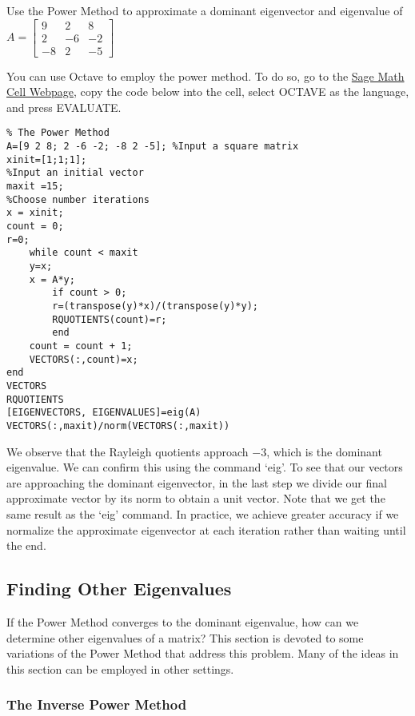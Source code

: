 \documentclass{ximera}
\begin{document}
\begin{exploration}\label{exp:3x3PowerMethod}
Use the Power Method to approximate a dominant eigenvector and eigenvalue of $A = \left[ \begin{array}{rrr}
9 & 2 & 8 \\
2 & -6 & -2 \\
-8 & 2 & -5
\end{array}\right]$

You can use Octave to employ the power method.  To do so, go to the \href{https://sagecell.sagemath.org/}{Sage Math Cell Webpage}, copy the code below into the cell, select OCTAVE as the language, and press EVALUATE.

\begin{verbatim}
% The Power Method
A=[9 2 8; 2 -6 -2; -8 2 -5]; %Input a square matrix
xinit=[1;1;1];
%Input an initial vector
maxit =15;
%Choose number iterations
x = xinit;
count = 0;
r=0;
    while count < maxit
    y=x;
    x = A*y;
        if count > 0; 
        r=(transpose(y)*x)/(transpose(y)*y);
        RQUOTIENTS(count)=r;
        end
    count = count + 1;
    VECTORS(:,count)=x;
end
VECTORS
RQUOTIENTS
[EIGENVECTORS, EIGENVALUES]=eig(A)
VECTORS(:,maxit)/norm(VECTORS(:,maxit))
\end{verbatim}

We observe that the Rayleigh quotients approach $-3$, which is the dominant eigenvalue.  We can confirm this using the command `eig'.  To see that our vectors are approaching the dominant eigenvector, in the last step we divide our final approximate vector by its norm to obtain a unit vector. Note that we get the same result as the `eig' command.  In practice, we achieve greater accuracy if we normalize the approximate eigenvector at each iteration rather than waiting until the end.

\end{exploration}

\subsection*{Finding Other Eigenvalues}

If the Power Method converges to the dominant eigenvalue, how can we determine other eigenvalues of a matrix?  This section is devoted to some variations of the Power Method that address this problem.  Many of the ideas in this section can be employed in other settings.

\subsubsection*{The Inverse Power Method}
\end{document}
